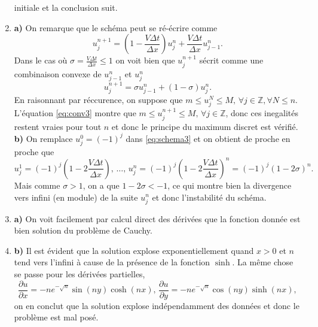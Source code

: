\documentclass[12pt,a4paper]{article}
\begin{document}
\begin{enumerate}
initiale et la conclusion suit.
\item {\bf a)}  On remarque que le sch\'ema peut se r\'e-\'ecrire comme
\begin{equation}\label{eq:schema3}
u_j^{n+1} = \left(1-\frac{V\Delta t}{\Delta x}\right)u^n_{j} +\frac{V\Delta t}{\Delta x}u_{j-1}^n.
\end{equation}
Dans le cas o\`u $\sigma = \frac{V\Delta t}{\Delta x} \le 1$ on voit bien que $u_j^{n+1}$ s\'ecrit comme une combinaison
convexe de $u_{j-1}^n$ et $u_{j}^n$ 
\begin{equation}\label{eq:conv3}
u_j^{n+1} =\sigma u^n_{j-1} +\left(1-\sigma\right)u_j^n.
\end{equation}
En raisonnant par r\'eccurence, on suppose que $m\le u_j^N \le
M,\, \forall j\in\mathbb{Z}, \forall N\le n$. L'\'equation
\eqref{eq:conv3} montre que $m\le u_j^{n+1} \le
M,\, \forall j\in\mathbb{Z}$, donc ces inegalit\'es restent vraies
pour tout $n$ et donc le principe du maximum discret est
v\'erifi\'e.\\
{\bf b)} On remplace $u_j^0=(-1)^j$ dans \eqref{eq:schema3} et on
obtient de proche en proche que
\begin{equation}
u_j^1 = (-1)^j\left(1-2\frac{V\Delta t}{\Delta
    x}\right),\,\hdots,\, u_j^n = (-1)^j\left(1-2\frac{V\Delta t}{\Delta
    x}\right)^n = (-1)^j\left(1-2\sigma\right)^n.
\end{equation}
Mais comme $\sigma>1$, on a que $1-2\sigma<-1$, ce qui
montre bien la divergence vers infini (en module) de la suite $u_j^n$
et donc l'instabilit\'e du sch\'ema.
\item {\bf a)} On voit facilement par calcul direct des dérivées que la fonction donnée est bien solution du problème de Cauchy.\\

\item {\bf b)} Il est évident que la solution explose exponentiellement quand $x>0$ et $n$ tend vers l'infini à cause de la présence de la fonction $\sinh$. La même chose se passe pour les dérivées partielles,
$$
\frac{\partial u}{\partial x} = -n e^{-\sqrt{n}}\sin (ny) \cosh (nx),\, \frac{\partial u}{\partial y} = -ne^{-\sqrt{n}}\cos(ny) \sinh (nx),
$$
on en conclut que la solution explose indépendamment des données et donc le problème est mal posé.

\end{enumerate}
\end{document}
